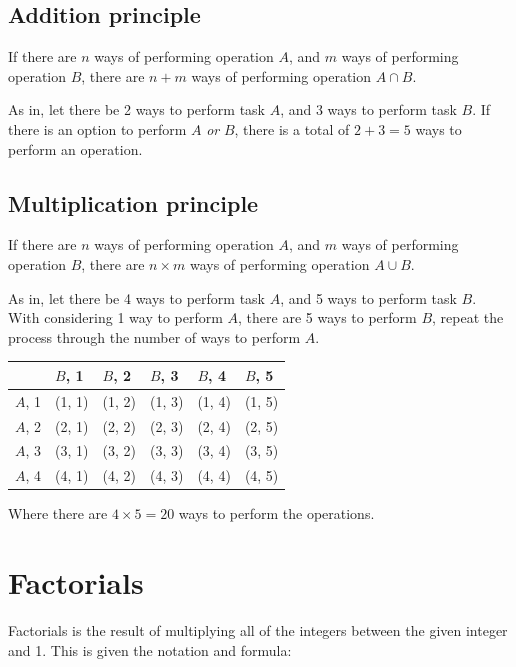 \documentclass{book}
\begin{document}
\section{Addition principle}
If there are $n$ ways of performing operation $A$, and $m$ ways of performing operation $B$, there are $n + m$ ways of performing operation $A \cap B$.

As in, let there be 2 ways to perform task $A$, and 3 ways to perform task $B$.  If there is an option to perform $A$ \emph{or} $B$, there is a total of $2 + 3 = 5$ ways to perform an operation.



\section{Multiplication principle}
If there are $n$ ways of performing operation $A$, and $m$ ways of performing operation $B$, there are $n \times m$ ways of performing operation $A \cup B$.

As in, let there be 4 ways to perform task $A$, and 5 ways to perform task $B$.  With considering 1 way to perform $A$, there are 5 ways to perform $B$, repeat the process through the number of ways to perform $A$.

\begin{center}
	\begin{tabular}{l|lllll}
		       & $B$, 1 & $B$, 2 & $B$, 3 & $B$, 4 & $B$, 5 \\ \hline
		$A$, 1 & (1, 1) & (1, 2) & (1, 3) & (1, 4) & (1, 5) \\
		$A$, 2 & (2, 1) & (2, 2) & (2, 3) & (2, 4) & (2, 5) \\
		$A$, 3 & (3, 1) & (3, 2) & (3, 3) & (3, 4) & (3, 5) \\
		$A$, 4 & (4, 1) & (4, 2) & (4, 3) & (4, 4) & (4, 5) \\
	\end{tabular}
\end{center}

Where there are $4 \times 5 = 20$ ways to perform the operations.




\chapter{Factorials}
Factorials is the result of multiplying all of the integers between the given integer and 1.  This is given the notation and formula:
\end{document}
